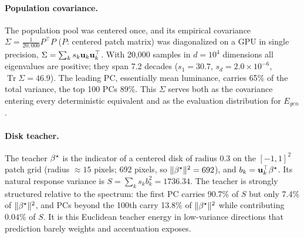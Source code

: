 \paragraph{Population covariance.}
The population pool was centered once, and its empirical covariance
$\Sigma=\frac1{20{,}000}P^\top P$ ($P$: centered patch matrix) was
diagonalized on a GPU in single precision, $\Sigma=\sum_ks_k{\mathbf{u}}_k{\mathbf{u}}_k^\top$.
With 20,000 samples in $d=10^4$ dimensions all eigenvalues are positive; they span
7.2 decades ($s_1=30.7$, $s_d=2.0\times10^{-6}$, $\operatorname{Tr}\Sigma=46.9$).
The leading PC, essentially mean luminance, carries 65\% of the total
variance, the top 100 PCs 89\%.  This $\Sigma$ serves both as the covariance
entering every deterministic equivalent and as the evaluation distribution for
$E_{gen}$.

\paragraph{Disk teacher.}
The teacher ${\beta^{\star}}$ is the indicator of a centered disk of radius $0.3$ on
the $[-1,1]^2$ patch grid (radius $\approx15$ pixels; 692 pixels, so
$\|{\beta^{\star}}\|^2=692$), and $b_k={\mathbf{u}}_k^\top{\beta^{\star}}$.  Its natural response
variance is $S=\sum_ks_kb_k^2=1736.34$.  The teacher is strongly structured
relative to the spectrum: the first PC carries 90.7\% of $S$ but only 7.4\% of
$\|{\beta^{\star}}\|^2$, and PCs beyond the 100th carry 13.8\% of $\|{\beta^{\star}}\|^2$ while
contributing $0.04\%$ of $S$.  It is this Euclidean teacher energy in
low-variance directions that prediction barely weights and accentuation
exposes.

